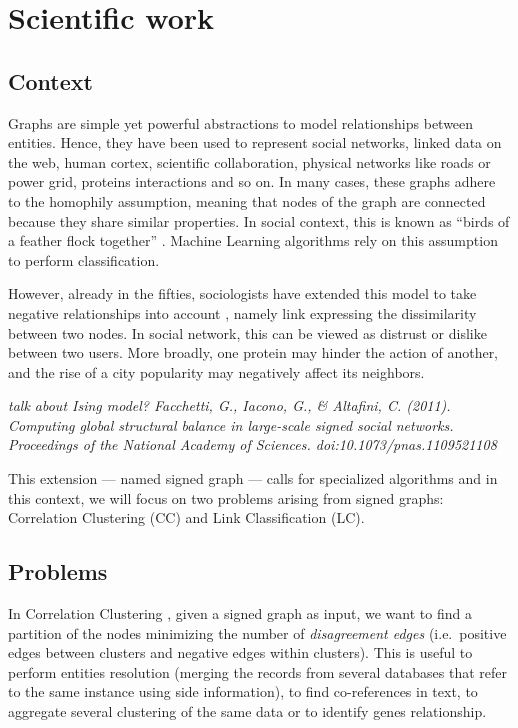 \section{Scientific work}\label{scientific-work}

\subsection{Context}\label{context}

Graphs are simple yet powerful abstractions to model relationships between
entities. Hence, they have been used to represent social networks, linked data
on the web, human cortex, scientific collaboration, physical networks like
roads or power grid, proteins interactions and so on. In many cases, these
graphs adhere to the homophily assumption, meaning that nodes of the graph are
connected because they share similar properties. In social context, this is
known as ``birds of a feather flock together'' \autocite{homophily01}. Machine
Learning algorithms rely on this assumption to perform classification.

However, already in the fifties, sociologists have extended this model to take
negative relationships into account \autocites{harary1953}{Cartwright56},
namely link expressing the dissimilarity between two nodes. In social network,
this can be viewed as distrust or dislike between two users. More broadly, one
protein may hinder the action of another, and the rise of a city popularity may
negatively affect its neighbors.

\emph{talk about Ising model? Facchetti, G., Iacono, G., \& Altafini, C.
(2011). Computing global structural balance in large-scale signed social
networks. Proceedings of the National Academy of Sciences.
doi:10.1073/pnas.1109521108}

This extension --- named signed graph --- calls for specialized algorithms and
in this context, we will focus on two problems arising from signed graphs:
Correlation Clustering (CC) and Link Classification (LC).

\subsection{Problems}\label{problems}

In Correlation Clustering \autocite{Bansal2002}, given a signed graph as input,
we want to find a partition of the nodes minimizing the number of
\emph{disagreement edges} (i.e.~positive edges between clusters and negative
edges within clusters). This is useful to perform entities resolution (merging
the records from several databases that refer to the same instance using side
information), to find co-references in text, to aggregate several clustering of
the same data or to identify genes relationship.


